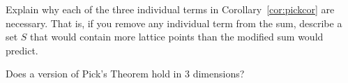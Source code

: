 \begin{explor}
	Explain why each of the three individual terms in Corollary~\ref{cor:pickcor} are necessary. That is, if you remove any individual term from the sum, describe a set $S$ that would contain more lattice points than the modified sum would predict.
\end{explor}

\begin{explor}
	Does a version of Pick's Theorem hold in $3$ dimensions?
\end{explor}